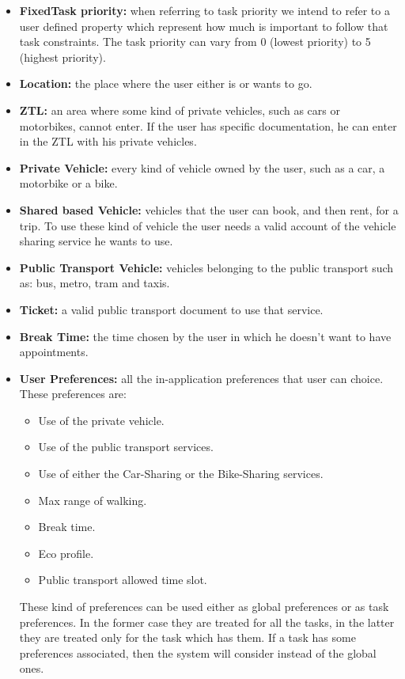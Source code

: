 \begin{itemize}
    \item \textbf{FixedTask priority:} when referring to task priority we intend to refer to a user defined property which represent how much is important to follow that task constraints. The task priority can vary from 0 (lowest priority) to 5 (highest priority).
     
    \item \textbf{Location:} the place where the user either is or wants to go.
    
    \item \textbf{ZTL:} an area where some kind of private vehicles, such as cars or motorbikes, cannot enter. If the user has specific documentation, he can enter in the ZTL with his private vehicles.
    
    \item \textbf{Private Vehicle:} every kind of vehicle owned by the user, such as a car, a motorbike or a bike.
    
    \item \textbf{Shared based Vehicle:} vehicles that the user can book, and then rent, for a trip. To use these kind of vehicle the user needs a valid account of the vehicle sharing service he wants to use.
    
    \item \textbf{Public Transport Vehicle:} vehicles belonging to the public transport such as: bus, metro, tram and taxis.
        
    \item \textbf{Ticket:} a valid public transport document to use that service.
    
    \item \textbf{Break Time:} the time chosen by the user in which he doesn't want to have appointments.
    
    \item \textbf{User Preferences:} all the in-application preferences that user can choice. These preferences are: 
    \begin{itemize}
        \item Use of the private vehicle.
        \item Use of the public transport services.
        \item Use of either the Car-Sharing or the Bike-Sharing services.
        \item Max range of walking.
    	\item Break time.
    	\item Eco profile.
    	\item Public transport allowed time slot.
    \end{itemize}
    These kind of preferences can be used either as global preferences or as task preferences. In the former case they are treated for all the tasks, in the latter they are treated only for the task which has them.
    If a task has some preferences associated, then the system will consider instead of the global ones.
    

\end{itemize}
